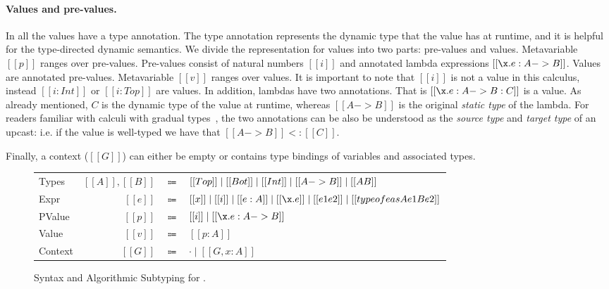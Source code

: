 \paragraph{Values and pre-values.} In \name all the values have
a type annotation. The type annotation represents the dynamic type
that the value has at runtime, and
it is helpful for the type-directed dynamic semantics.
We divide the representation for values into two parts: pre-values and
values.
Metavariable $[[p]]$ ranges over pre-values. Pre-values
consist of natural numbers $[[i]]$
and annotated lambda expressions $[[\x.e : A -> B]]$. Values are
annotated pre-values. Metavariable $[[v]]$ ranges over
values. It is important to note that $[[i]]$ is not a value in this
calculus, instead $[[i:Int]]$ or $[[i:Top]]$ are values.
In addition, lambdas have two annotations. That is $[[\x.e : A -> B : C]]$ is a value.
As already mentioned, $C$ is the dynamic type of the value
at runtime, whereas $[[A -> B]]$ is the original \emph{static type} of the lambda.
For readers familiar with calculi with gradual types~\cite{}, the two annotations
can be also be understood as the \emph{source type} and \emph{target type}
of an upcast: i.e. if the value is well-typed we have that $[[A -> B]] <: [[C]]$.

Finally, a context ($[[G]]$) can
either be empty or contains type bindings of variables and associated
types.

\begin{figure}[t]
  \begin{small}
    \centering
    \begin{tabular}{lrcl} \toprule
      Types & $[[A]], [[B]]$ & $\Coloneqq$ & $ [[Top]] \mid [[Bot]] \mid [[Int]] \mid [[A -> B]] \mid [[A \/ B]] $ \\
      Expr & $[[e]]$ & $\Coloneqq$ & $[[x]] \mid [[i]] \mid [[e:A]] \mid [[\x.e]] \mid [[e1 e2]] \mid [[typeof e as A e1 B e2]]$\\
      PValue & $[[p]]$ & $\Coloneqq$ & $[[i]] \mid [[\x.e : A -> B]] $\\
      Value & $[[v]]$ & $\Coloneqq$ & $[[p:A]]$\\
      Context & $[[G]]$ & $\Coloneqq$ & $ \cdot \mid [[G , x : A]]$ \\
      \bottomrule
    \end{tabular}
  \end{small}
  \begin{small}
    \centering
  \end{small}
  \caption{Syntax and Algorithmic Subtyping for \cal.  }
  \label{fig:union:syntax}
\end{figure}

